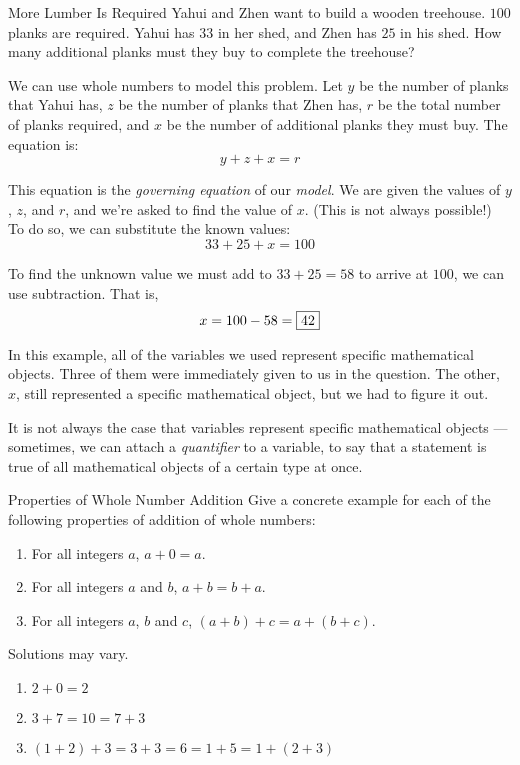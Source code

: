 \documentclass[a4paper,10pt]{report}
\begin{document}
\begin{problem}{More Lumber Is Required}
  Yahui and Zhen want to build a wooden treehouse. \(100\) planks are required. Yahui has
  \(33\) in her shed, and Zhen has \(25\) in his shed. How many additional planks must they
  buy to complete the treehouse?

  \begin{solution}
    We can use whole numbers to model this problem. Let \(y\) be the number of planks that
    Yahui has, \(z\) be the number of planks that Zhen has, \(r\) be the total number of
    planks required, and \(x\) be the number of additional planks they must buy. The
    equation is: \[
      y + z + x = r
    \]

    This equation is the \emph{governing equation} of our \emph{model}. We are given the
    values of \(y\), \(z\), and \(r\), and we're asked to find the value of \(x\). (This is
    not always possible!) To do so, we can substitute the known values: \[
      33 + 25 + x = 100
    \]

    To find the unknown value we must add to \(33 + 25 = 58\) to arrive at \(100\), we can
    use subtraction. That is, \[
      x = 100 - 58 = \Ans{42}
    \]
  \end{solution}
\end{problem}

In this example, all of the variables we used represent specific mathematical objects. Three
of them were immediately given to us in the question. The other, \(x\), still represented a
specific mathematical object, but we had to figure it out.

It is not always the case that variables represent specific mathematical objects ---
sometimes, we can attach a \emph{quantifier} to a variable, to say that a statement is true
of all mathematical objects of a certain type at once.

\begin{problem}{Properties of Whole Number Addition}
  Give a concrete example for each of the following properties of addition of whole numbers:

  \begin{enumerate}
    \item For all integers \(a\), \(a + 0 = a\).
    \item For all integers \(a\) and \(b\), \(a + b = b + a\).
    \item For all integers \(a\), \(b\) and \(c\), \((a + b) + c = a + (b + c)\).
  \end{enumerate}

  \begin{solution}
    Solutions may vary.

    \begin{enumerate}
      \item \(2 + 0 = 2\)
      \item \(3 + 7 = 10 = 7 + 3\)
      \item \((1 + 2) + 3 = 3 + 3 = 6 = 1 + 5 = 1 + (2 + 3)\)
    \end{enumerate}
  \end{solution}
\end{problem}
\end{document}
